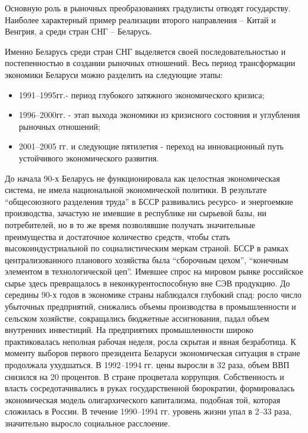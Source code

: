 \documentclass[14pt,a4paper]{article}
\begin{document}
    Основную роль в рыночных преобразованиях градулисты отводят государству.
    Наиболее характерный пример реализации второго направления – Китай и Венгрия, а среди стран СНГ – Беларусь.
    \par
    Именно Беларусь среди стран СНГ выделяется своей последовательностью и постепенностью в создании рыночных отношений.
    Весь период трансформации экономики Беларуси можно разделить на следующие этапы:
    \begin{itemize}
        \item 1991--1995гг.- период глубокого затяжного экономического кризиса;
        \item 1996--2000гг. - этап выхода экономики из кризисного состояния и углубления рыночных отношений;
        \item 2001--2005 гг. и следующие пятилетия - переход на инновационный путь устойчивого экономического развития.
    \end{itemize}
    \par
    До начала 90-х Беларусь не функционировала как целостная экономическая система, не имела национальной экономической политики.
    В результате ``общесоюзного разделения труда'' в БССР развивались ресурсо- и энергоемкие производства, зачастую не имевшие в республике ни сырьевой базы, ни потребителей, но в то же время позволявшие получать значительные преимущества и достаточное количество средств, чтобы стать высокоиндустриальной по социалистическим меркам страной.
    БССР в рамках централизованного планового хозяйства была ``сборочным цехом'', ``конечным элементом в технологической цеп''.
    Имевшее спрос на мировом рынке российское сырье здесь превращалось в неконкурентоспособную вне СЭВ продукцию.
    До середины 90-х годов в экономике страны наблюдался глубокий спад: росло число убыточных предприятий, снижались объемы производства в промышленности и сельском хозяйстве, сокращались бюджетные ассигнования, падал объем внутренних инвестиций.
    На предприятиях промышленности широко практиковалась неполная рабочая неделя, росла скрытая и явная безработица.
    К моменту выборов первого президента Беларуси экономическая ситуация в стране продолжала ухудшаться.
    В 1992--1994 гг. цены выросли в 32 раза, объем ВВП снизился на 20 процентов.
    В стране процветала коррупция. Собственность и власть сосредотачивались в руках государственной бюрократии, формировалась экономическая модель олигархического капитализма, подобная той, которая сложилась в России.
    В течение 1990--1994 гг. уровень жизни упал в 2--33 раза, значительно выросло социальное расслоение.
\end{document}
